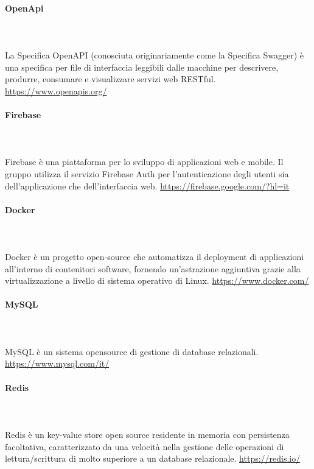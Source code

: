 \paragraph{OpenApi}\mbox{}\\ \\
La Specifica OpenAPI (conosciuta originariamente come la Specifica Swagger) è una specifica per file di interfaccia leggibili dalle macchine per descrivere, produrre, consumare e visualizzare servizi web RESTful.
\href{https://www.openapis.org/}{https://www.openapis.org/}

\paragraph{Firebase}\mbox{}\\ \\
Firebase è una piattaforma per lo sviluppo di applicazioni web e mobile. Il gruppo utilizza il servizio Firebase Auth per l'autenticazione degli utenti sia dell'applicazione che dell'interfaccia web.
\href{https://firebase.google.com/?hl=it}{https://firebase.google.com/?hl=it}

\paragraph{Docker}\mbox{}\\ \\
Docker è un progetto open-source che automatizza il deployment di applicazioni all'interno di contenitori software, fornendo un'astrazione aggiuntiva grazie alla virtualizzazione a livello di sistema operativo di Linux.
\href{https://www.docker.com/}{https://www.docker.com/}

\paragraph{MySQL}\mbox{}\\ \\
MySQL è un sistema opensource di gestione di database relazionali.
\href{https://www.mysql.com/it/}{https://www.mysql.com/it/}

\paragraph{Redis}\mbox{}\\ \\
Redis è un key-value store open source residente in memoria con persistenza facoltativa, caratterizzato da una velocità nella gestione delle operazioni di lettura/scrittura di molto superiore a un database relazionale.
\href{https://redis.io/}{https://redis.io/}

